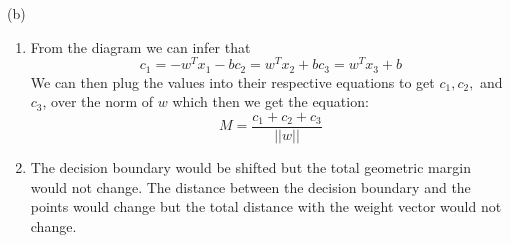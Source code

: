 \documentclass{article}
\begin{document}
(b)
\begin{enumerate}[label=(\roman*)]
    \item From the diagram we can infer that 
    \begin{equation*}
        c_1 = -w^Tx_1-b
        c_2 = w^Tx_2+b
        c_3 = w^Tx_3+b
    \end{equation*}
    We can then plug the values into their respective equations to get $c_1, c_2,$ and $c_3$, over the norm of $w$ which then we get the equation:
    \begin{equation*}
        M = \frac{c_1 + c_2 + c_3}{||w||}
    \end{equation*}
    \item The decision boundary would be shifted but the total geometric margin would not change. The distance between the decision boundary and the points would change but the total distance with the weight vector would not change.
\end{enumerate}
\end{document}
